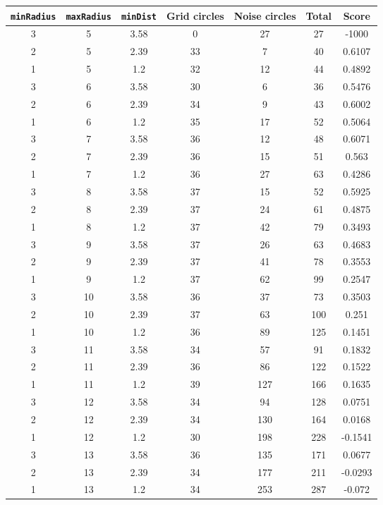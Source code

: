\documentclass[letterpaper, 12pt]{article}
\begin{document}
\begin{longtable}{|c|c|c|c|c|c|c|}
\hline
\textbf{\texttt{minRadius}} & \textbf{\texttt{maxRadius}} & \textbf{\texttt{minDist}} & \textbf{Grid circles} & \textbf{Noise circles} & \textbf{Total} & \textbf{Score} \\
\hline
3 & 5 & 3.58 & 0 & 27 & 27 & -1000 \\
\hline
2 & 5 & 2.39 & 33 & 7 & 40 & 0.6107 \\
\hline
1 & 5 & 1.2 & 32 & 12 & 44 & 0.4892 \\
\hline
3 & 6 & 3.58 & 30 & 6 & 36 & 0.5476 \\
\hline
2 & 6 & 2.39 & 34 & 9 & 43 & 0.6002 \\
\hline
1 & 6 & 1.2 & 35 & 17 & 52 & 0.5064 \\
\hline
3 & 7 & 3.58 & 36 & 12 & 48 & 0.6071 \\
\hline
2 & 7 & 2.39 & 36 & 15 & 51 & 0.563 \\
\hline
1 & 7 & 1.2 & 36 & 27 & 63 & 0.4286 \\
\hline
3 & 8 & 3.58 & 37 & 15 & 52 & 0.5925 \\
\hline
2 & 8 & 2.39 & 37 & 24 & 61 & 0.4875 \\
\hline
1 & 8 & 1.2 & 37 & 42 & 79 & 0.3493 \\
\hline
3 & 9 & 3.58 & 37 & 26 & 63 & 0.4683 \\
\hline
2 & 9 & 2.39 & 37 & 41 & 78 & 0.3553 \\
\hline
1 & 9 & 1.2 & 37 & 62 & 99 & 0.2547 \\
\hline
3 & 10 & 3.58 & 36 & 37 & 73 & 0.3503 \\
\hline
2 & 10 & 2.39 & 37 & 63 & 100 & 0.251 \\
\hline
1 & 10 & 1.2 & 36 & 89 & 125 & 0.1451 \\
\hline
3 & 11 & 3.58 & 34 & 57 & 91 & 0.1832 \\
\hline
2 & 11 & 2.39 & 36 & 86 & 122 & 0.1522 \\
\hline
1 & 11 & 1.2 & 39 & 127 & 166 & 0.1635 \\
\hline
3 & 12 & 3.58 & 34 & 94 & 128 & 0.0751 \\
\hline
2 & 12 & 2.39 & 34 & 130 & 164 & 0.0168 \\
\hline
1 & 12 & 1.2 & 30 & 198 & 228 & -0.1541 \\
\hline
3 & 13 & 3.58 & 36 & 135 & 171 & 0.0677 \\
\hline
2 & 13 & 2.39 & 34 & 177 & 211 & -0.0293 \\
\hline
1 & 13 & 1.2 & 34 & 253 & 287 & -0.072 \\

\end{longtable}
\end{document}
